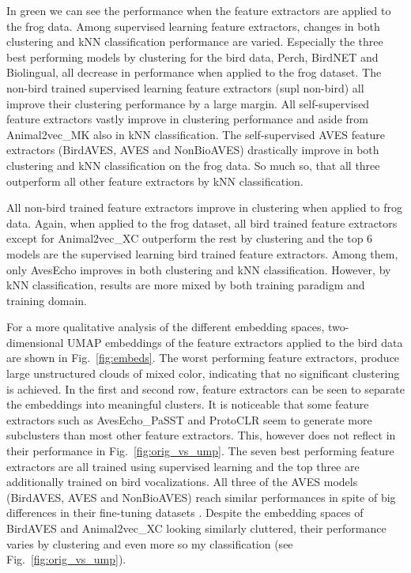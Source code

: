 In green we can see the performance when the feature extractors are applied to the frog data.
Among supervised learning feature extractors, changes in both clustering and kNN classification performance are varied.
Especially the three best performing models by clustering for the bird data, Perch, BirdNET and Biolingual, all decrease in performance when applied to the frog dataset.
The non-bird trained supervised learning feature extractors (supl non-bird) all improve their clustering performance by a large margin.
All self-supervised feature extractors vastly improve in clustering performance and aside from Animal2vec\_MK also in kNN classification.
The self-supervised AVES feature extractors (BirdAVES, AVES and NonBioAVES) drastically improve in both clustering and kNN classification on the frog data.
So much so, that all three outperform all other feature extractors by kNN classification.

All non-bird trained feature extractors improve in clustering when applied to frog data.
Again, when applied to the frog dataset, all bird trained feature extractors except for Animal2vec\_XC outperform the rest by clustering and the top 6 models are the supervised learning bird trained feature extractors.
Among them, only AvesEcho improves in both clustering and kNN classification.
However, by kNN classification, results are more mixed by both training paradigm and training domain.


For a more qualitative analysis of the different embedding spaces, two-dimensional UMAP embeddings of the feature extractors applied to the bird data are shown in Fig.~\ref{fig:embeds}.
The worst performing feature extractors, produce large unstructured clouds of mixed color, indicating that no significant clustering is achieved.
In the first and second row, feature extractors can be seen to separate the embeddings into meaningful clusters.
It is noticeable that some feature extractors such as AvesEcho\_PaSST and ProtoCLR seem to generate more subclusters than most other feature extractors.
This, however does not reflect in their performance in Fig.~\ref{fig:orig_vs_ump}.
The seven best performing feature extractors are all trained using supervised learning and the top three are additionally trained on bird vocalizations.
All three of the AVES models (BirdAVES, AVES and NonBioAVES) reach similar performances in spite of big differences in their fine-tuning datasets \cite{hagiwara_aves_2022}.
Despite the embedding spaces of BirdAVES and Animal2vec\_XC looking similarly cluttered, their performance varies by clustering and even more so my classification (see Fig.~\ref{fig:orig_vs_ump}).


